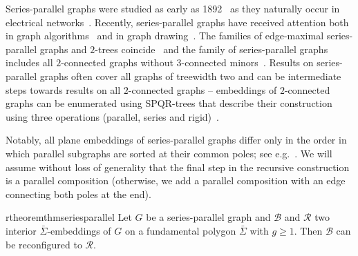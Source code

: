 \documentclass[a4paper,USenglish,cleveref,colorlinks=true,urlcolor=black,linkcolor=black,citecolor=black,thm-restate,authorcolumns]{lipics-v2021}
\newcommand{\prooflink}[1]{\hypersetup{linkcolor=lipicsBulletGray}\hyperref[#1]{$\blacktriangledown$}}
\newcommand{\statlink}[1]{\hypersetup{linkcolor=lipicsYellow}\hyperref[#1]{$\blacktriangle$}}
\newcommand{\mylink}{}
\theoremstyle{claimstyle}
\begin{document}
 \noindent Series-parallel graphs were studied as early as 1892~\cite{MACMAHON1994225} as they naturally occur in electrical networks~\cite{DUFFIN1965303,MACMAHON1994225,https://doi.org/10.1002/sapm194221183}.
Recently, series-parallel graphs have received attention both in graph algorithms~\cite{DBLP:journals/combinatorics/BencsHR23,DBLP:journals/acta/BlochHansenS25,DBLP:journals/cys/MedinaGMH22,DBLP:journals/dm/PanZ22} and in graph drawing~\cite{DBLP:journals/tcs/AngeliniBKM22,DBLP:conf/icaa/AzgorR25,DBLP:journals/algorithmica/DidimoKLO23,DBLP:journals/jgaa/Eppstein21}.
The families of edge-maximal series-parallel graphs and $2$-trees coincide~\cite{1992177} and the family of series-parallel graphs includes all $2$-connected graphs without $3$-connected minors~\cite{DBLP:journals/algorithmica/BienstockM90}.
Results on series-parallel graphs often cover all graphs of treewidth two and can be intermediate steps towards  results on all $2$-connected graphs --  embeddings of  $2$-connected graphs  can be enumerated using SPQR-trees that describe their construction using three operations (parallel, series and rigid)~\cite{DBLP:journals/siamcomp/BattistaT96}.

Notably, all plane embeddings of series-parallel graphs differ only in the order in which parallel subgraphs are sorted at their common poles; see e.g.~\cite{DBLP:journals/algorithmica/BienstockM90}.
We will assume without loss of generality that the final step in the recursive construction is a parallel composition (otherwise, we add a parallel composition with an edge connecting both poles at the end).

\begin{restatable}{rtheorem}{thmseriesparallel}
    \label{thm:seriesparallel}
    \renewcommand{\mylink}{\statlink{thm:seriesparallel}\prooflink{Pseriesparallel}}
    Let $G$ be a series-parallel graph and $\mathcal{B}$ and $\mathcal{R}$  two interior $\bar{\Sigma}$-embeddings of $G$ on a fundamental polygon $\bar{\Sigma}$ with $g \geq 1$. Then $\mathcal{B}$ can be reconfigured to $\mathcal{R}$.
\end{restatable}
\end{document}
